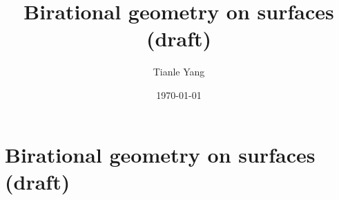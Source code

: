 \documentclass{noteformyself}
\title{Birational geometry on surfaces (draft)}
\author{Tianle Yang}
\date{\today}
\begin{document}
    \maketitle

    \section{Birational geometry on surfaces (draft)}



\end{document}

